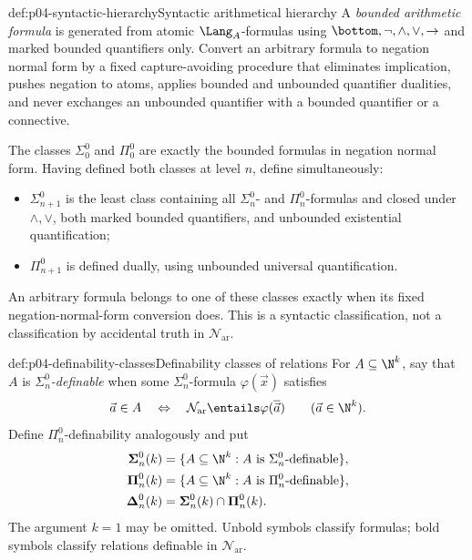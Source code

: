 \begin{hbdefinition}{def:p04-syntactic-hierarchy}{Syntactic arithmetical hierarchy}
A \emph{bounded arithmetic formula} is generated from atomic
\(\Lang_A\)-formulas using \(\bottom,\neg,\land,\lor,\to\) and marked
bounded quantifiers only.  Convert an arbitrary formula to negation normal
form by a fixed capture-avoiding procedure that eliminates implication,
pushes negation to atoms, applies bounded and unbounded quantifier dualities,
and never exchanges an unbounded quantifier with a bounded quantifier or a
connective.

The classes \(\Sigma^0_0\) and \(\Pi^0_0\) are exactly the bounded formulas
in negation normal form.  Having defined both classes at level \(n\), define
simultaneously:
\begin{itemize}
 \item \(\Sigma^0_{n+1}\) is the least class containing all
       \(\Sigma^0_n\)- and \(\Pi^0_n\)-formulas and closed under
       \(\land,\lor\), both marked bounded quantifiers, and unbounded
       existential quantification;
 \item \(\Pi^0_{n+1}\) is defined dually, using unbounded universal
       quantification.
\end{itemize}
An arbitrary formula belongs to one of these classes exactly when its fixed
negation-normal-form conversion does.  This is a syntactic classification,
not a classification by accidental truth in \(\mathcal N_{\mathrm{ar}}\).
\end{hbdefinition}

\begin{hbdefinition}{def:p04-definability-classes}{Definability classes of relations}
For \(A\subseteq\N^k\), say that \(A\) is
\emph{\(\Sigma^0_n\)-definable} when some \(\Sigma^0_n\)-formula
\(\varphi(\vec x)\) satisfies
\[
 \vec a\in A\quad\Leftrightarrow\quad
 \mathcal N_{\mathrm{ar}}\entails\varphi(\overline{\vec a})
 \qquad(\vec a\in\N^k).
\]
Define \(\Pi^0_n\)-definability analogously and put
\[
\begin{aligned}
 \boldsymbol\Sigma^0_n(k)&=\{A\subseteq\N^k:A\text{ is }
   \Sigma^0_n\text{-definable}\},\\
 \boldsymbol\Pi^0_n(k)&=\{A\subseteq\N^k:A\text{ is }
   \Pi^0_n\text{-definable}\},\\
 \boldsymbol\Delta^0_n(k)&=
   \boldsymbol\Sigma^0_n(k)\cap\boldsymbol\Pi^0_n(k).
\end{aligned}
\]
The argument \(k=1\) may be omitted.  Unbold symbols classify formulas;
bold symbols classify relations definable in \(\mathcal N_{\mathrm{ar}}\).
\end{hbdefinition}

